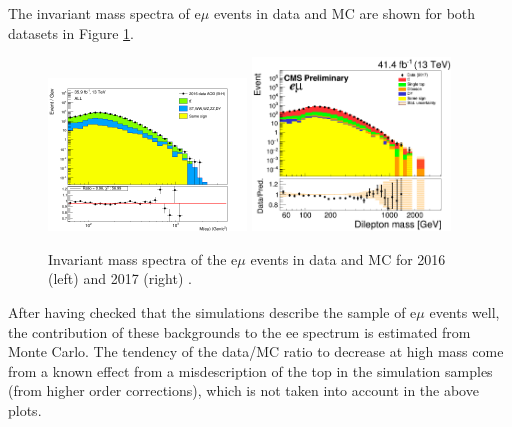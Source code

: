 The invariant mass spectra of e$\mu$ events in data and MC are shown for both datasets in Figure \ref{fig:ttbaremu}.

\begin{figure}[!htb]
\begin{center}
\includegraphics[angle=0,width=0.47\textwidth]{figures/Zprime/2016/bkg_ttbar/SS/hratio_M_emu1__ALL.png}
\includegraphics[angle=0,width=0.47\textwidth]{figures/Zprime/2017/bkg_ttbar/SS/ALL_hratio_M_emu_massDep.png}
\caption{Invariant mass spectra of the e$\mu$ events in data and MC for 2016 (left) \cite{CMS-AN-2016-404} and 2017 (right) \cite{CMS-AN-2018-021}.}
\label{fig:ttbaremu}
\end{center}
\end{figure}

After having checked that the simulations describe the sample of e$\mu$ events well, the
contribution of these backgrounds to the ee spectrum is estimated from Monte Carlo. The tendency of the data/MC ratio to decrease at high mass come from a known effect from a misdescription of the top \pt in the \ttbar simulation samples (from higher order corrections), which is not taken into account in the above plots.


